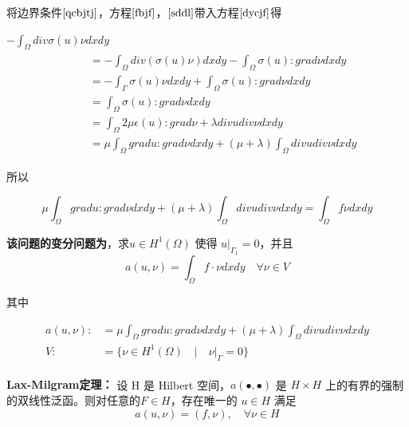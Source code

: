 \documentclass[a4paper,UTF8,titlepage]{ctexart}
\begin{document}
将边界条件$\eqref{qcbjtj}$，方程$\eqref{fbjf}$，$\eqref{sddl}$带入方程$\eqref{dycjf}$得

\par \quad \quad
$-\int_{\Omega} div \sigma(u) \nu dxdy$
$$ 
\quad \quad
\begin{matrix}
	\begin{aligned}
		&= -\int_{\Omega} div(\sigma(u) \nu) dxdy - \int_{\Omega} \sigma(u) : grad \nu dxdy \\
		&= -\int_{\Gamma} \sigma(u) \nu dxdy + \int_{\Omega} \sigma(u) : grad \nu dxdy \\
		&= \int_{\Omega} \sigma(u) : grad \nu dxdy \\
		&= \int_{\Omega} 2 \mu \epsilon(u) : grad \nu + \lambda div u div \nu dxdy  \\
		&= \mu \int_{\Omega} grad u : grad \nu dxdy + (\mu +\lambda) \int_{\Omega} div u div \nu  dxdy
	\end{aligned}
\end{matrix}
$$

所以

\begin{equation}
\mu \int_{\Omega} grad u : grad \nu dxdy + (\mu +\lambda) \int_{\Omega} div u div \nu  dxdy = \int_{\Omega} f \nu dxdy
\end{equation}

\textbf{该问题的变分问题为}，求$u \in H^1(\Omega)$ 使得 $u |_{\Gamma_1} = 0$，并且
\begin{equation}
a(u,\nu) = \int_{\Omega} f \cdot \nu dxdy \quad \forall \nu \in V
\label{bffc}
\end{equation}
\par
其中

\begin{equation}
	\begin{aligned}
		a(u,\nu) :&= \mu \int_{\Omega} grad u : grad \nu dxdy + (\mu +\lambda) \int_{\Omega} div u div \nu  dxdy \\  		
		V :&= \{ \nu \in H^1(\Omega) \quad | \quad \nu |_{\Gamma} = 0 \}
	\end{aligned}
\end{equation}

\textbf{Lax-Milgram定理\textsuperscript{\cite{brenner2008mathematical}}：} 设 H 是 Hilbert 空间，$a(\bullet,\bullet)$ 是 $H \times H$ 上的有界的强制的双线性泛函。则对任意的$F \in H$，存在唯一的 $u \in H$ 满足
\begin{equation}
	a(u,\nu) = (f,\nu), \quad \forall \nu \in H 
\end{equation}
\end{document}

